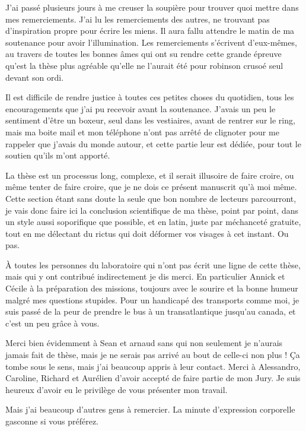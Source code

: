 J'ai passé plusieurs jours à me creuser la soupière pour trouver quoi mettre dans mes remerciements. J'ai lu les remerciements 
des autres, ne trouvant pas d'inspiration propre pour écrire les miens. Il aura fallu attendre le matin de ma soutenance pour 
avoir l'illumination. Les remerciements s'écrivent d'eux-mêmes, au travers de toutes les bonnes âmes qui ont su rendre cette 
grande épreuve qu'est la thèse plus agréable qu'elle ne l'aurait été pour robinson crusoé seul devant son ordi. 

Il est difficile de rendre justice à toutes ces petites choses du quotidien, tous les encouragements que j'ai pu recevoir avant 
la soutenance. J'avais un peu le sentiment d'être un boxeur, seul dans les vestiaires, avant de rentrer sur le ring, mais ma 
boite mail et mon téléphone n'ont pas arrêté de clignoter pour me rappeler que j'avais du monde autour, et cette partie leur 
est dédiée, pour tout le soutien qu'ils m'ont apporté. 

La thèse est un processus long, complexe, et il serait illusoire de faire croire, ou même tenter de faire croire, que je ne dois
ce présent manuscrit qu'à moi même. Cette section étant sans doute la seule que bon nombre de lecteurs parcourront, je vais donc
faire ici la conclusion scientifique de ma thèse, point par point, dans un style aussi soporifique que possible, et en latin,
juste par méchanceté gratuite, tout en me délectant du rictus qui doit déformer vos visages à cet instant. Ou pas.

À toutes les personnes du laboratoire qui n'ont pas écrit une ligne de cette thèse, mais qui y ont contribué indirectement je
dis merci. En particulier Annick et Cécile à la préparation des missions, toujours avec le sourire et la bonne humeur malgré mes
questions stupides. Pour un handicapé des transports comme moi, je suis passé de la peur de prendre le bus à un transatlantique
jusqu'au canada, et c'est un peu grâce à vous. 

Merci bien évidemment à Sean et arnaud sans qui non seulement je n'aurais jamais fait de thèse, mais je ne serais pas arrivé au
bout de celle-ci non plus ! Ça tombe sous le sens, mais j'ai beaucoup appris à leur contact. Merci à Alessandro, Caroline,
Richard et Aurélien d'avoir accepté de faire partie de mon Jury. Je suis heureux d'avoir eu le privilège de vous présenter mon travail.

Mais j'ai beaucoup d'autres gens à remercier. La minute d'expression corporelle gasconne si vous préférez. 

